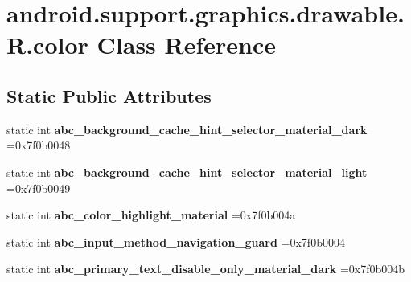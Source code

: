 \hypertarget{classandroid_1_1support_1_1graphics_1_1drawable_1_1R_1_1color}{}\section{android.\+support.\+graphics.\+drawable.\+R.\+color Class Reference}
\label{classandroid_1_1support_1_1graphics_1_1drawable_1_1R_1_1color}
\subsection*{Static Public Attributes}
\begin{DoxyCompactItemize}
\item 
\mbox{\label{classandroid_1_1support_1_1graphics_1_1drawable_1_1R_1_1color_a821a2124d6953818c469b7cf406192d1}} 
static int {\bfseries abc\+\_\+background\+\_\+cache\+\_\+hint\+\_\+selector\+\_\+material\+\_\+dark} =0x7f0b0048
\item 
\mbox{\label{classandroid_1_1support_1_1graphics_1_1drawable_1_1R_1_1color_a69c2074da4e257daa90c92316143fd1e}} 
static int {\bfseries abc\+\_\+background\+\_\+cache\+\_\+hint\+\_\+selector\+\_\+material\+\_\+light} =0x7f0b0049
\item 
\mbox{\label{classandroid_1_1support_1_1graphics_1_1drawable_1_1R_1_1color_a97acdd3ec6247b040070c1a7820cfa1e}} 
static int {\bfseries abc\+\_\+color\+\_\+highlight\+\_\+material} =0x7f0b004a
\item 
\mbox{\label{classandroid_1_1support_1_1graphics_1_1drawable_1_1R_1_1color_aef64c0315cb7c881e8558a2172e62fc2}} 
static int {\bfseries abc\+\_\+input\+\_\+method\+\_\+navigation\+\_\+guard} =0x7f0b0004
\item 
\mbox{\label{classandroid_1_1support_1_1graphics_1_1drawable_1_1R_1_1color_ab07dc3b23bc6887ac6fed8b6281ed79f}} 
static int {\bfseries abc\+\_\+primary\+\_\+text\+\_\+disable\+\_\+only\+\_\+material\+\_\+dark} =0x7f0b004b

\end{DoxyCompactItemize}

